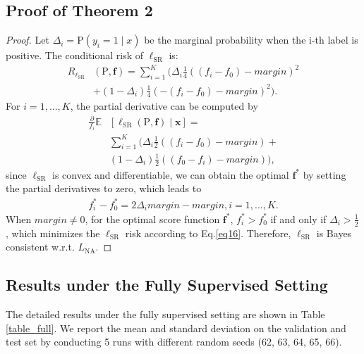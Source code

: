 \documentclass[11pt]{article}
\begin{document}
\subsection{Proof of Theorem 2}
\label{a1}
\begin{proof}
Let $\Delta_{i} = \mathrm{P}(y_{i}=1 \mid x)$ be the marginal probability when the i-th label is positive. The conditional risk of $\ell_{\mathrm{SR}}$ is:
\begin{equation}
\begin{aligned}\label{eq17}
R_{\ell_{\mathrm{SR}}}&(\mathrm{P}, \boldsymbol{f})=\sum_{i=1}^{K}(\Delta_{i}\frac{1}{4}((f_{i}-f_{0})-margin)^{2}\\&+(1-\Delta_{i})\frac{1}{4}(-(f_{i}-f_{0})-margin)^{2}).
\end{aligned}
\end{equation}
For $i=1,...,K$, the partial derivative can be computed by
\begin{equation}
\begin{aligned}\label{eq18}
\frac{\partial}{f_{i}}\mathbb{E}&[{\ell_{\mathrm{SR}}}(\mathrm{P}, \boldsymbol{f}) \mid \boldsymbol{x}]=\\&\sum_{i=1}^{K}(\Delta_{i}\frac{1}{2}((f_{i}-f_{0})-margin)+\\&(1-\Delta_{i})\frac{1}{2}((f_{0}-f_{i})-margin)),
\end{aligned}
\end{equation}
since $\ell_{\mathrm{SR}}$ is convex and differentiable, we can obtain the optimal $\boldsymbol{f}^{*}$ by setting the partial derivatives to zero, which leads to
\begin{equation}
\begin{aligned}\label{eq19}
f_{i}^{*}-f_{0}^{*}=2\Delta_{i} margin-margin, i=1,...,K.
\end{aligned}
\end{equation}
When $margin \neq 0$, for the optimal score function $\boldsymbol{f}^{*}$, $f_{i}^{*}>f_{0}^{*}$ if and only if $\Delta_{i}>\frac{1}{2}$, which minimizes the $\ell_{\mathrm{SR}}$ risk according to Eq.\ref{eq16}. Therefore, $\ell_{\mathrm{SR}}$ is Bayes consistent w.r.t. $L_{\mathrm{NA}}$.
\end{proof}

\subsection{Results under the Fully Supervised Setting}
\label{c2}

The detailed results under the fully supervised setting are shown in Table \ref{table_full}. We report the mean and standard deviation on the validation and test set by conducting 5 runs with different random seeds (62, 63, 64, 65, 66).
\end{document}
